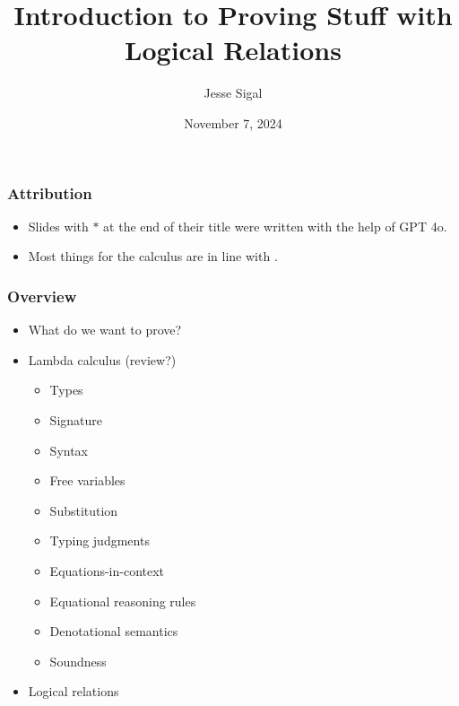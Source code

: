 \documentclass[aspectratio=169]{beamer}
\title{Introduction to Proving Stuff\textsuperscript{\texttrademark} with Logical Relations}
\author{Jesse Sigal}
\date{November 7, 2024}
\begin{document}
\begin{frame}
\titlepage
\end{frame}

\begin{frame}
\frametitle{Attribution}
\begin{itemize}
\item Slides with $*$ at the end of their title were written with the help of GPT 4o.
\item Most things for the calculus are in line with \cite{Crole_1994}.
\end{itemize}
\end{frame}

\begin{frame}
\frametitle{Overview}
\begin{itemize}
    \item What do we want to prove?
    \item Lambda calculus (review?)
    \begin{itemize}
        \item Types
        \item Signature
        \item Syntax
        \item Free variables
        \item Substitution
        \item Typing judgments
        \item Equations-in-context
        \item Equational reasoning rules
        \item Denotational semantics
        \item Soundness
    \end{itemize}
    \item Logical relations
\end{itemize}
\end{frame}
\end{document}
